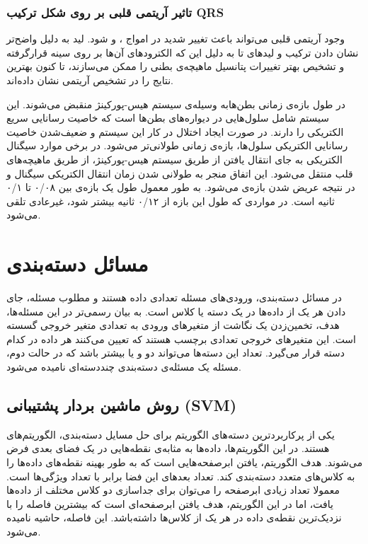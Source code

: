 \subsubsection{تاثیر آریتمی قلبی بر روی شکل ترکیب QRS}
 وجود آریتمی قلبی می‌تواند باعث تغییر شدید در امواج ،  و  شود. لید  به دلیل واضح‌تر نشان دادن ترکیب  و لیدهای  تا  به دلیل این که الکترودهای آن‌ها بر روی سینه قرارگرفته و تشخیص بهتر تغییرات پتانسیل ماهیچه‌ی بطنی را ممکن می‌سازند، تا کنون بهترین نتایج را در تشخیص آریتمی نشان داده‌اند. \cite{ECGSurvey}

در طول بازه‌ی زمانی  بطن‌هابه وسیله‌ی سیستم هیس-پورکینژ منقبض می‌شوند. این سیستم شامل سلول‌هایی در دیواره‌های بطن‌ها است که خاصیت رسانایی سریع الکتریکی را دارند. در صورت ایجاد اختلال در کار این سیستم و ضعیف‌شدن خاصیت رسانایی الکتریکی سلول‌ها، بازه‌ی زمانی  طولانی‌تر می‌شود. در برخی موارد سیگنال الکتریکی به جای انتقال یافتن از طریق سیستم هیس-پورکینژ، از طریق ماهیچه‌های قلب منتقل می‌شود. این اتفاق منجر به طولانی شدن زمان انتقال الکتریکی سیگنال و در نتیجه عریض شدن بازه‌ی  می‌شود.
 به طور معمول طول یک بازه‌ی  بین ۰/۰۸ تا ۰/۱ ثانیه است. در مواردی که طول این بازه از ۰/۱۲ ثانیه بیشتر شود،  غیرعادی تلقی می‌شود. \cite{Healio}

\section{مسائل دسته‌بندی}

در مسائل دسته‌بندی، ورودی‌های مسئله تعدادی داده هستند و مطلوب مسئله، جای دادن هر یک از داده‌ها در یک دسته یا کلاس است. به بیان رسمی‌تر در این مسئله‌ها، هدف، تخمین‌زدن یک نگاشت از متغیرهای ورودی  به تعدادی متغیر خروجی گسسته  است. این متغیرهای خروجی تعدادی برچسب هستند که تعیین می‌کنند هر داده در کدام دسته قرار می‌گیرد. تعداد این دسته‌ها می‌تواند دو و یا بیشتر باشد که در حالت دوم، مسئله یک مسئله‌ی دسته‌بندی چنددسته‌ای نامیده می‌شود. 

\subsection{روش ماشین بردار پشتیبانی (SVM)}
یکی از پرکاربردترین دسته‌های الگوریتم برای حل مسایل دسته‌بندی، الگوریتم‌های  هستند. در این الگوریتم‌ها، داده‌ها به مثابه‌ی نقطه‌هایی در یک فضای بعدی فرض می‌شوند. هدف الگوریتم، یافتن ابرصفحه‌هایی است که به طور بهینه نقطه‌های داده‌ها را به کلاس‌های متعدد دسته‌بندی کند. تعداد بعدهای این فضا  برابر با تعداد ویژگی‌ها است. معمولا تعداد زیادی ابرصفحه را می‌توان برای جداسازی دو کلاس مختلف از داده‌ها یافت، اما در این الگوریتم، هدف یافتن ابرصفحه‌ای است که بیشترین فاصله را با نزدیک‌ترین نقطه‌ی داده در هر یک از کلاس‌ها داشته‌باشد. این فاصله، حاشیه نامیده می‌شود. 

